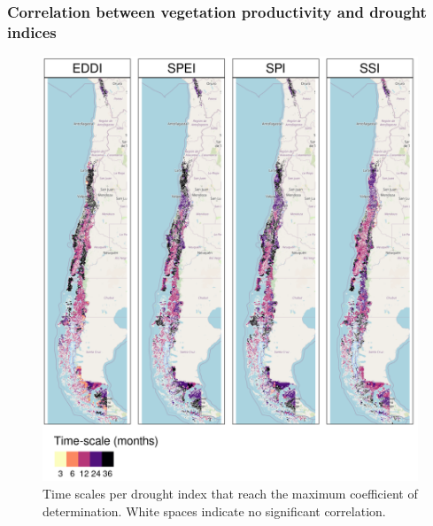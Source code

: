\documentclass[
  authoryear,
  preprint,
  3p,
  onecolumn]{elsarticle}
\begin{document}
\hypertarget{correlation-between-vegetation-productivity-and-drought-indices}{%
\subsubsection{Correlation between vegetation productivity and drought
indices}\label{correlation-between-vegetation-productivity-and-drought-indices}}

\begin{figure}[!ht]

{\centering \includegraphics{../output/figs/mapa_cor_selec_indices_zcNDVI6.png}

}

\caption{\label{fig-corTimeScale}Time scales per drought index that
reach the maximum coefficient of determination. White spaces indicate no
significant correlation.}

\end{figure}
\end{document}
